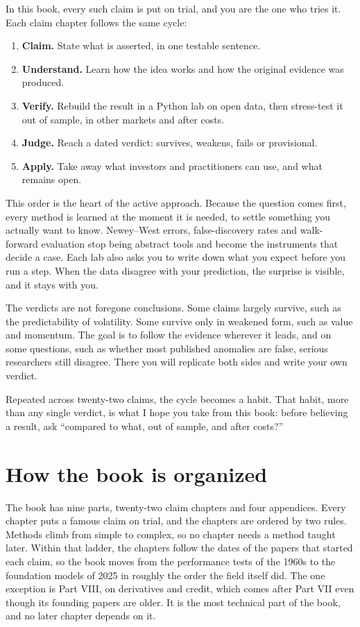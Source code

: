 In this book, every such claim is put on trial, and you are the one who tries it. Each claim chapter follows the same cycle:

\begin{enumerate}
  \item \textbf{Claim.} State what is asserted, in one testable sentence.
  \item \textbf{Understand.} Learn how the idea works and how the original evidence was produced.
  \item \textbf{Verify.} Rebuild the result in a Python lab on open data, then stress-test it out of sample, in other markets and after costs.
  \item \textbf{Judge.} Reach a dated verdict: survives, weakens, fails or provisional.
  \item \textbf{Apply.} Take away what investors and practitioners can use, and what remains open.
\end{enumerate}

This order is the heart of the active approach. Because the question comes first, every method is learned at the moment it is needed, to settle something you actually want to know. Newey--West errors, false-discovery rates and walk-forward evaluation stop being abstract tools and become the instruments that decide a case. Each lab also asks you to write down what you expect before you run a step. When the data disagree with your prediction, the surprise is visible, and it stays with you.

The verdicts are not foregone conclusions. Some claims largely survive, such as the predictability of volatility. Some survive only in weakened form, such as value and momentum. The goal is to follow the evidence wherever it leads, and on some questions, such as whether most published anomalies are false, serious researchers still disagree. There you will replicate both sides and write your own verdict.

Repeated across twenty-two claims, the cycle becomes a habit. That habit, more than any single verdict, is what I hope you take from this book: before believing a result, ask ``compared to what, out of sample, and after costs?''

\section*{How the book is organized}

The book has nine parts, twenty-two claim chapters and four appendices. Every chapter puts a famous claim on trial, and the chapters are ordered by two rules. Methods climb from simple to complex, so no chapter needs a method taught later. Within that ladder, the chapters follow the dates of the papers that started each claim, so the book moves from the performance tests of the 1960s to the foundation models of 2025 in roughly the order the field itself did. The one exception is Part VIII, on derivatives and credit, which comes after Part VII even though its founding papers are older. It is the most technical part of the book, and no later chapter depends on it.

